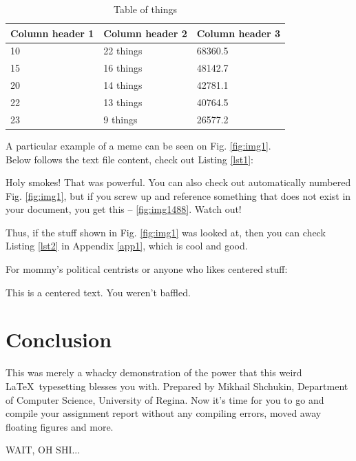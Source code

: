 \documentclass[journal,onecolumn]{IEEEtran}
\begin{document}
\begin{table}[h]
\centering
\caption{Table of things} 
\label{tab:tab1}
	\begin{tabular}{ | l | l | l |}
 		\hline
 		Column header 1 & Column header 2 & Column header 3 \\ \hline
 		10 & 22 things & 68360.5  \\ \hline
		15 & 16 things & 48142.7 \\ \hline
		20 & 14 things & 42781.1  \\ \hline
		22 & 13 things & 40764.5 \\ \hline
		23 & 9 things & 26577.2 \\ \hline
	\end{tabular}
\end{table}

A particular example of a meme can be seen on Fig. \ref{fig:img1}.
\\

Below follows the text file content, check out Listing \ref{lst1}:

\lstset{basicstyle=\ttfamily}


Holy smokes! That was powerful. You can also check out automatically numbered Fig. \ref{fig:img1}, but if you screw up and reference something that does not exist in your document, you get this -- \ref{fig:img1488}. Watch out!

Thus, if the stuff shown in Fig. \ref{fig:img1} was looked at, then you can check Listing \ref{lst2} in Appendix \ref{app1}, which is cool and good.

For mommy's political centrists or anyone who likes centered stuff:
\begin{center}
This is a centered text. You weren't baffled.
\end{center}

\section{Conclusion}
This was merely a whacky demonstration of the power that this weird \LaTeX ~typesetting blesses you with. Prepared by Mikhail Shchukin, Department of Computer Science, University of Regina. Now it's time for you to go and compile your assignment report without any compiling errors, moved away floating figures and more.
\begin{center}
WAIT, OH SHI...
\end{center}
\end{document}
